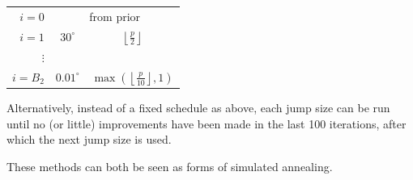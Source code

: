 \documentclass[ejs,preprint]{imsart}
\begin{document}
\begin{center}
\begin{tabular}{r|cc}
$i=0$ & \multicolumn{2}{c}{from prior} \\
$i=1$ & $30^\circ$ & $\left\lfloor\frac{p}{2}\right\rfloor$ \\
$\vdots$ & & \\
$i=B_2$ & $0.01^\circ$ & $\max\left(\left\lfloor\frac{p}{10}\right\rfloor, 1\right)$
\end{tabular}
\end{center}

Alternatively, instead of a fixed schedule as above, each jump size can be run until no (or little) improvements have been made in the last 100 iterations, after which the next jump size is used.

These methods can both be seen as forms of simulated annealing.




















\end{document}
